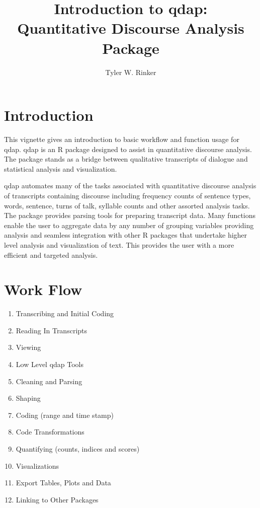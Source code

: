 \documentclass[a4paper]{article}\usepackage{graphicx, color}
\newcommand{\pkg}[1]{{\normalfont\fontseries{b}\selectfont #1}}
\newcommand{\proglang}[1]{\textsf{#1}}
\begin{document}
\title{Introduction to \pkg{qdap}:\\Quantitative Discourse Analysis Package}
\author{Tyler W. Rinker}
\maketitle




\section*{Introduction}
\hspace{.4cm} This vignette gives an introduction to basic workflow and function 
usage for \pkg{qdap}. \pkg{qdap} is an \proglang{R} package designed
to assist in quantitative discourse analysis. The package stands as a bridge
between qualitative transcripts of dialogue and statistical analysis and
visualization.
\vspace{.5cm}

\pkg{qdap} automates many of the tasks associated with quantitative 
discourse analysis of transcripts containing discourse including frequency 
counts of sentence types, words, sentence, turns of talk, syllable counts and 
other assorted analysis tasks. The package provides parsing tools for preparing 
transcript data. Many functions enable the user to aggregate data by any number 
of grouping variables providing analysis and seamless integration with other 
\proglang{R} packages that undertake higher level analysis and visualization of 
text. This provides the user with a more efficient and targeted analysis.

\section*{Work Flow}
\begin{enumerate}
  \item Transcribing and Initial Coding
  \item Reading In Transcripts
  \item Viewing
  \item Low Level qdap Tools
  \item Cleaning and Parsing
  \item Shaping   %
  \item Coding (range and time stamp) %
  \item Code Transformations
  \item Quantifying (counts, indices and scores)%
  \item Visualizations   %
  \item Export Tables, Plots and Data  %
  \item Linking to Other Packages  %
\end{enumerate}
\end{document}
